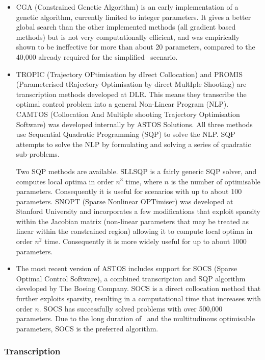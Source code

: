 \begin{itemize}
\item CGA (Constrained Genetic Algorithm) is an early implementation of a genetic algorithm, currently limited to integer parameters. It gives a better global search than the other implemented methods (all gradient based methods) but is not very computationally efficient, and was empirically shown to be ineffective for more than about 20 parameters, compared to the 40,000 already required for the simplified \BW\ scenario.
\item TROPIC (Trajectory OPtimisation by dIrect Collocation) and PROMIS (Parameterised tRajectory Optimisation by direct MultIple Shooting) are transcription methods developed at DLR. This means they transcribe the optimal control problem into a general Non-Linear Program (NLP). CAMTOS (Collocation And Multiple shooting Trajectory Optimisation Software) was developed internally by ASTOS Solutions. All three methods use Sequential Quadratic Programming (SQP) to solve the NLP. SQP attempts to solve the NLP by formulating and solving a series of quadratic sub-problems.

Two SQP methods are available. SLLSQP is a fairly generic SQP solver, and computes local optima in order $n^{3}$ time, where $n$ is the number of optimisable parameters. Consequently it is useful for scenarios with up to about 100 parameters. SNOPT (Sparse Nonlinear OPTimiser) was developed at Stanford University and incorporates a few modifications that exploit sparsity within the Jacobian matrix (non-linear parameters that may be treated as linear within the constrained region) allowing it to compute local optima in order $n^{2}$ time. Consequently it is more widely useful for up to about 1000 parameters.

\item The most recent version of ASTOS includes support for SOCS (Sparse Optimal Control Software), a combined transcription and SQP algorithm developed by The Boeing Company. SOCS is a direct collocation method that further exploits sparsity, resulting in a computational time that increases with order $n$. SOCS has successfully solved problems with over 500,000 parameters. Due to the long duration of \BW\ and the multitudinous optimisable parameters, SOCS is the preferred algorithm.
\end{itemize}



\subsubsection{Transcription}

